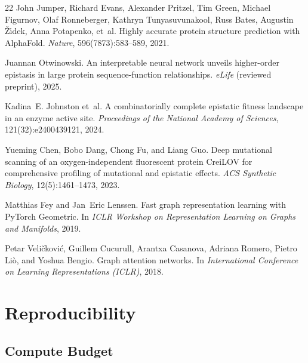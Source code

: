 \documentclass{article}
\begin{document}
\begin{thebibliography}{22}
John Jumper, Richard Evans, Alexander Pritzel, Tim Green, Michael Figurnov, Olaf Ronneberger, Kathryn Tunyasuvunakool, Russ Bates, Augustin \v{Z}\'{\i}dek, Anna Potapenko, et~al.
\newblock Highly accurate protein structure prediction with {AlphaFold}.
\newblock \emph{Nature}, 596(7873):583--589, 2021.

Juannan Otwinowski.
\newblock An interpretable neural network unveils higher-order epistasis in large protein sequence-function relationships.
\newblock \emph{eLife} (reviewed preprint), 2025.

Kadina~E. Johnston et~al.
\newblock A combinatorially complete epistatic fitness landscape in an enzyme active site.
\newblock \emph{Proceedings of the National Academy of Sciences}, 121(32):e2400439121, 2024.

Yueming Chen, Bobo Dang, Chong Fu, and Liang Guo.
\newblock Deep mutational scanning of an oxygen-independent fluorescent protein {CreiLOV} for comprehensive profiling of mutational and epistatic effects.
\newblock \emph{ACS Synthetic Biology}, 12(5):1461--1473, 2023.

Matthias Fey and Jan~Eric Lenssen.
\newblock Fast graph representation learning with {PyTorch Geometric}.
\newblock In \emph{ICLR Workshop on Representation Learning on Graphs and Manifolds}, 2019.

Petar Veli{\v{c}}kovi{\'c}, Guillem Cucurull, Arantxa Casanova, Adriana Romero, Pietro Li{\`o}, and Yoshua Bengio.
\newblock Graph attention networks.
\newblock In \emph{International Conference on Learning Representations (ICLR)}, 2018.

\end{thebibliography}

\appendix
\section{Reproducibility}
\label{app:reproducibility}

\subsection{Compute Budget}
\end{document}
